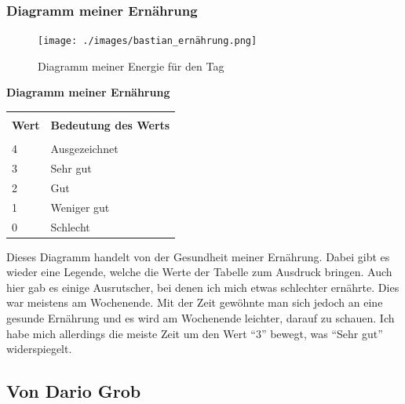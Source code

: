 \subsubsection{Diagramm meiner Ernährung}
\begin{figure}[H]
  \centering
  \texttt{[image: ./images/bastian\_ernährung.png]}
  \caption{Diagramm meiner Energie für den Tag}
\end{figure}
\textbf{Diagramm meiner Ernährung}
\newline
\begin{table}[htp]
  \begin{tabularx}{\textwidth}{l X}\hline \\
    \textbf{Wert} & \textbf{Bedeutung des Werts}  \\\hline \\
    4 & Ausgezeichnet \\
    3 & Sehr gut \\
    2 & Gut \\
    1 & Weniger gut \\
    0 & Schlecht
    \\\hline
  \end{tabularx}
\end{table}
\newline
Dieses Diagramm handelt von der Gesundheit meiner Ernährung. Dabei gibt es wieder eine Legende, welche die Werte der Tabelle zum Ausdruck bringen. Auch hier gab es einige Ausrutscher, bei denen ich mich etwas schlechter ernährte. Dies war meistens am Wochenende. Mit der Zeit gewöhnte man sich jedoch an eine gesunde Ernährung und es wird am Wochenende leichter, darauf zu schauen. Ich habe mich allerdings die meiste Zeit um den Wert “3” bewegt, was “Sehr gut” widerspiegelt.
\subsection{Von Dario Grob}
\authortoc{\dario}{\subsectionident}
